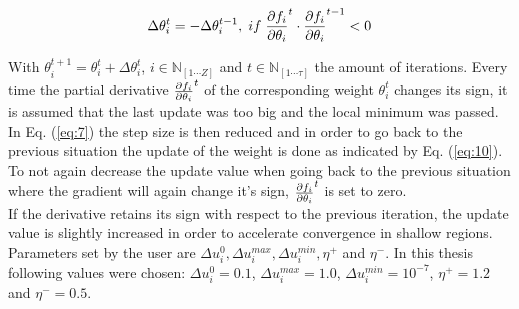 \begin{equation}\label{eq:10}
	\Delta \theta^t_i = -\Delta \theta^{t-1}_i, \hspace{1mm} if \hspace{1mm} \pdv{f_i}{\theta_i}^t \cdot \pdv{f_i}{\theta_i}^{t-1} < 0
\end{equation}



With $\theta_i^{t+1} = \theta_i^{t} + \Delta \theta^t_i$, $i \in \mathbb{N}_{[1\cdots Z]}$ and $t \in \mathbb{N}_{[1 \cdots \mathbb{\tau}]}$ the amount of iterations. Every time the partial derivative $\pdv{f_i}{\theta_i}^t$ of the corresponding weight $\theta_i^t$ changes its sign, it is assumed that the last update was too big and the local minimum was passed. In Eq. (\ref{eq:7}) the step size is then reduced and in order to go back to the previous situation the update of the weight is done as indicated by Eq. (\ref{eq:10}). To not again decrease the update value when going back to the previous situation where the gradient will again change it's sign,  $\pdv{f_i}{\theta_i}^{t}$ is set to zero.\\
If the derivative retains its sign with respect to the previous iteration, the update value is slightly increased in order to accelerate convergence in shallow regions. \cite{RPROP} Parameters set by the user are $\Delta u^0_i,\Delta u^{max}_i,\Delta u^{min}_i, \eta^+$ and $\eta^-$. In this thesis following values were chosen: $\Delta u^0_i = 0.1$, $\Delta u^{max}_i=1.0$, $\Delta u^{min}_i=10^{-7}$, $\eta^+ = 1.2$ and $\eta^- = 0.5$.

%



